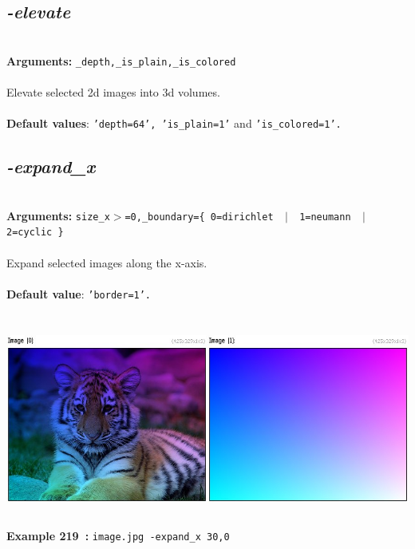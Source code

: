 \documentclass[a4paper,11pt,twoside]{book}
\begin{document}
\subsection{\emph{-elevate} }\vspace*{-0.5em}
~\\\textbf{Arguments: } 
{\small \texttt{\_depth,\_is\_plain,\_is\_colored}}\\~\\
Elevate selected 2d images into 3d volumes.
~\\~\\\textbf{Default values}: {\small \texttt{'depth=64', 'is\_plain=1'} and \texttt{'is\_colored=1'.}}


\subsection{\emph{-expand\_x} }\vspace*{-0.5em}
~\\\textbf{Arguments: } 
{\small \texttt{size\_x$>$=0,\_boundary=\{ 0=dirichlet ~$|$~ 1=neumann ~$|$~ 2=cyclic \}}}\\~\\
Expand selected images along the x-axis.
~\\~\\\textbf{Default value}: {\small \texttt{'border=1'.}}
\begin{center}\includegraphics[keepaspectratio=true,height=7cm,width=\textwidth]{img/gmic_def219.jpg}\\
{\footnotesize \textbf{Example 219~:} \texttt{image.jpg -expand\_x 30,0}}
\end{center}
\end{document}
